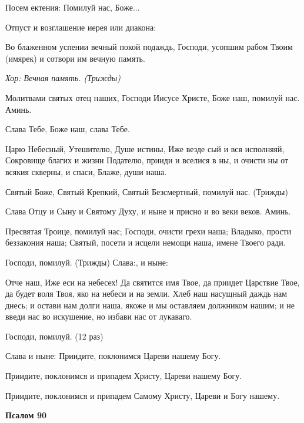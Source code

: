 Посем ектения: Помилуй нас, Боже... 

Отпуст и возглашение иерея или диакона: 

Во блаженном успении вечный покой подаждь, Господи, усопшим рабом Твоим (имярек) и сотвори им вечную память. 

\itshape Хор:\normalfont{} Вечная память. (\itshape Трижды\normalfont{})


\mychapterending

 


Молитвами святых отец наших, Господи Иисусе Христе, Боже наш, помилуй нас. Аминь. 

Слава Тебе, Боже наш, слава Тебе. 

Царю Небесный, Утешителю, Душе истины, Иже везде сый и вся исполняяй, Сокровище благих и жизни Подателю, прииди и вселися в ны, и очисти ны от всякия скверны, и спаси, Блаже, души наша. 

Святый Боже, Святый Крепкий, Святый Безсмертный, помилуй нас. (Трижды) 

Слава Отцу и Сыну и Святому Духу, и ныне и присно и во веки веков. Аминь. 

Пресвятая Троице, помилуй нас; Господи, очисти грехи наша; Владыко, прости беззакония наша; Святый, посети и исцели немощи наша, имене Твоего ради. 

Господи, помилуй. (Трижды) Слава:, и ныне: 

Отче наш, Иже еси на небесех! Да святится имя Твое, да приидет Царствие Твое, да будет воля Твоя, яко на небеси и на земли. Хлеб наш насущный даждь нам днесь; и остави нам долги наша, якоже и мы оставляем должником нашим; и не введи нас во искушение, но избави нас от лукаваго. 

Господи, помилуй. (12 раз) 

Слава и ныне: Приидите, поклонимся Цареви нашему Богу. 

Приидите, поклонимся и припадем Христу, Цареви нашему Богу. 

Приидите, поклонимся и припадем Самому Христу, Цареви и Богу нашему.


\medskip


\bfseries Псалом 90\normalfont{}


